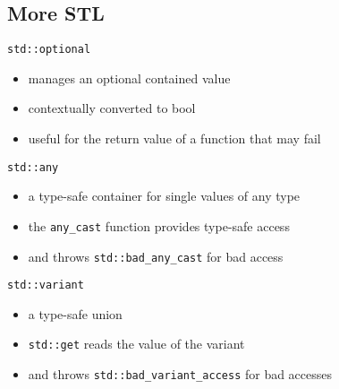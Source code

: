 \subsection{More STL}

\begin{frame}[fragile]
  \begin{block}{\texttt{std::optional}}
    \begin{itemize}
    \item manages an optional contained value
    \item contextually converted to bool
    \item useful for the return value of a function that may fail
    \end{itemize}
  \end{block}
  \begin{block}{\texttt{std::any}}
    \begin{itemize}
    \item a type-safe container for single values of any type
    \item the \texttt{any\_cast} function provides type-safe access
    \item and throws \texttt{std::bad\_any\_cast} for bad access
    \end{itemize}
  \end{block}
  \begin{block}{\texttt{std::variant}}
    \begin{itemize}
    \item a type-safe union
    \item \texttt{std::get} reads the value of the variant
    \item and throws \texttt{std::bad\_variant\_access} for bad accesses
    \end{itemize}
  \end{block}
\end{frame}

